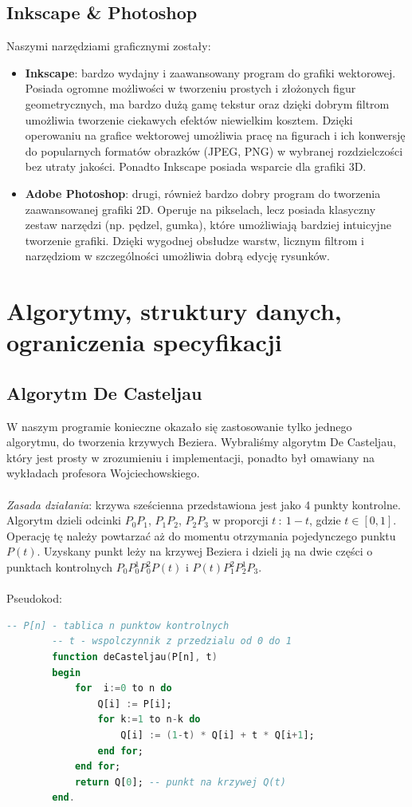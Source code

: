 \documentclass[a4paper,twoside]{article}
\begin{document}
	\subsection{Inkscape \& Photoshop}
	Naszymi narzędziami graficznymi zostały:
	\begin{itemize}
		\item \textbf{Inkscape}: bardzo wydajny i zaawansowany program do grafiki wektorowej. Posiada ogromne możliwości w tworzeniu prostych i złożonych figur geometrycznych, ma bardzo dużą gamę tekstur oraz dzięki dobrym filtrom umożliwia tworzenie ciekawych efektów niewielkim kosztem. Dzięki operowaniu na grafice wektorowej umożliwia pracę na figurach i ich konwersję do popularnych formatów obrazków (JPEG, PNG) w wybranej rozdzielczości bez utraty jakości. Ponadto Inkscape posiada wsparcie dla grafiki 3D.
		\item \textbf{Adobe Photoshop}: drugi, również bardzo dobry program do tworzenia zaawansowanej grafiki 2D. Operuje na pikselach, lecz posiada klasyczny zestaw narzędzi (np. pędzel, gumka), które umożliwiają bardziej intuicyjne tworzenie grafiki. Dzięki wygodnej obsłudze warstw, licznym filtrom i narzędziom w szczególności umożliwia dobrą edycję rysunków.
	\end{itemize}
	
	\section{Algorytmy, struktury danych, ograniczenia specyfikacji}
	\subsection{Algorytm De Casteljau}
	W naszym programie konieczne okazało się zastosowanie tylko jednego algorytmu, do tworzenia krzywych Beziera. Wybraliśmy algorytm De Casteljau, który jest prosty w zrozumieniu i implementacji, ponadto był omawiany na wykładach profesora Wojciechowskiego.\\\\
	\emph{Zasada działania}: krzywa sześcienna przedstawiona jest jako 4 punkty kontrolne. Algorytm dzieli odcinki $ P_0 P_1 $, $ P_1 P_2 $, $ P_2 P_3 $ w proporcji $ t\: : \: 1-t $, gdzie $ t \in [0, 1] $. Operację tę należy powtarzać aż do momentu otrzymania pojedynczego punktu $ P(t) $. Uzyskany punkt leży na krzywej Beziera i dzieli ją na dwie części o punktach kontrolnych $ P_0 P_0^1 P_0^2 P(t) $ i $ P(t) P_1^2 P_2^1 P_3 $.\\\\
	Pseudokod:
	\begin{lstlisting}[language=Ada, frame=single, autogobble=true, commentstyle=\ttfamily\itshape\color{gray}, frameround=ffff,rulecolor=\color{black}, tabsize=4]
		-- P[n] - tablica n punktow kontrolnych
		-- t - wspolczynnik z przedzialu od 0 do 1
		function deCasteljau(P[n], t)
		begin
			for  i:=0 to n do
				Q[i] := P[i];
				for k:=1 to n-k do
					Q[i] := (1-t) * Q[i] + t * Q[i+1];
				end for;
			end for;
			return Q[0]; -- punkt na krzywej Q(t)
		end.
	\end{lstlisting}
	
\end{document}
